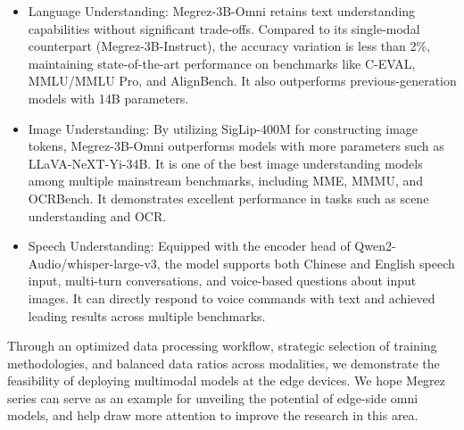 \begin{itemize}
    \item Language Understanding: Megrez-3B-Omni retains text understanding capabilities without significant trade-offs. Compared to its single-modal counterpart (Megrez-3B-Instruct), the accuracy variation is less than 2\%, maintaining state-of-the-art performance on benchmarks like C-EVAL, MMLU/MMLU Pro, and AlignBench. It also outperforms previous-generation models with 14B parameters.
    
    \item Image Understanding: By utilizing SigLip-400M for constructing image tokens, Megrez-3B-Omni outperforms models with more parameters such as LLaVA-NeXT-Yi-34B. It is one of the best image understanding models among multiple mainstream benchmarks, including MME, MMMU, and OCRBench. It demonstrates excellent performance in tasks such as scene understanding and OCR.
    
    \item  Speech Understanding: Equipped with the encoder head of Qwen2-Audio/whisper-large-v3, the model supports both Chinese and English speech input, multi-turn conversations, and voice-based questions about input images. It can directly respond to voice commands with text and achieved leading results across multiple benchmarks.
\end{itemize}


Through an optimized data processing workflow, strategic selection of training methodologies, and balanced data ratios across modalities, we demonstrate the feasibility of deploying multimodal models at the edge devices. We hope Megrez series can serve as an example for unveiling the potential of edge-side omni models, and help draw more attention to improve the research in this area.